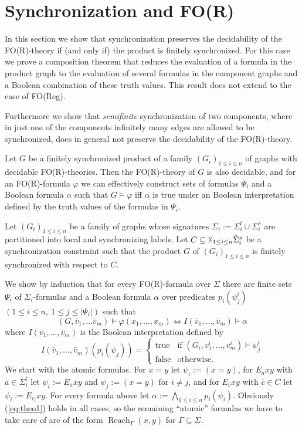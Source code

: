 \documentclass{LMCS}
\renewcommand{\phi}{\varphi}
\DeclareMathOperator{\Reach}{Reach}
\begin{document}
\section{Synchronization and FO(R)}

In this section we show that synchronization preserves the decidability 
of the FO(R)-theory if (and only if) the product is finitely synchronized.
For this case we prove a composition theorem that reduces the evaluation
of a formula in the product graph to the evaluation of several formulas in
the component graphs and a Boolean combination of these truth values.
This result does not extend to the case of FO(Reg).

Furthermore we show that \emph{semifinite} synchronization of two components,
where in just  one of the components infinitely many edges are allowed to
be synchronized, does in general not preserve the decidability of the FO(R)-theory.

\begin{thm}\label{theo:compos}
Let $G$ be a finitely synchronized product of a family $(G_i)_{1 \le i \le n}$ of graphs 
with decidable FO(R)-theories. Then the FO(R)-theory of $G$ is also decidable, and for an
FO(R)-formula $\phi$ we can effectively construct sets of formulas $\Psi_i$ and a Boolean 
formula $\alpha$ such that $G \models \phi$ iff $\alpha$ is true under an Boolean interpretation
defined by the truth values of the formulas in $\Psi_i$.
\end{thm}

\proof
Let $(G_i)_{1 \le i \le n}$ be a family of graphs whose signatures 
$\Sigma_i := \Sigma_i^l \cup \Sigma_i^s$ are partitioned into local and synchronizing labels.  
Let $C \subseteq \vartimes_{1 \le i \le n} \tilde\Sigma_i^s$ be a synchronization constraint
such that the product $G$ of $(G_i)_{1 \le i \le n}$ is finitely synchronized with respect
to $C$.

We show by induction that for every FO(R)-formula over $\Sigma$ there are finite sets 
$\Psi_i$ of $\Sigma_i$-formulas and a Boolean 
formula $\alpha$ over predicates $p_i(\psi_j^i)$ $(1 \le i \le n,\ 1 \le j \le |\Psi_i|)$
such that 
\begin{equation}\label{eq:theo1}
(G, \bar v_1,\ldots \bar v_m) \models \phi(x_1,\ldots, x_m) \Leftrightarrow
  I(\bar v_1, \ldots, \bar v_m) \models \alpha
\end{equation}
where $I(\bar v_1, \ldots, \bar v_m)$ is the Boolean interpretation defined by 
\[I(\bar v_1, \ldots, \bar v_m)(p_i(\psi_j))= 
  \begin{cases} 
  \text{true} & \text{if } (G_i,v_1^i,\ldots,v_m^i) \models \psi_j^i \\
  \text{false} & \text{otherwise.}
  \end{cases}
\]
We start with the atomic formulas. For $x=y$ let $\psi_i:=(x=y)$, for $E_a xy$ 
with $a \in \Sigma_i^l$ let $\psi_i:=E_axy$ and $\psi_j:=(x=y)$ for $i \neq j$, and
for $E_{\bar c} xy$ with $\bar c \in C$ let $\psi_i:=E_{c_i}xy$. 
For every formula above let $\alpha:=\bigwedge_{1 \le 
i \le n} p_i(\psi_i)$. Obviously (\ref{eq:theo1}) holds in all cases, so the remaining
``atomic'' formulas we have to take care of are of the form $\Reach_{\Gamma}(x,y)$
for $\Gamma \subseteq \Sigma$. 
\end{document}
